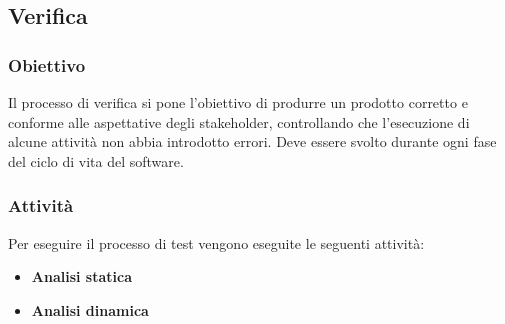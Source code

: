 \subsection{Verifica}
\subsubsection{Obiettivo}
Il processo di verifica si pone l’obiettivo di produrre un prodotto corretto e conforme alle aspettative degli stakeholder, controllando che l'esecuzione di alcune attività non abbia introdotto errori.
Deve essere svolto durante ogni fase del ciclo di vita del software.

\subsubsection{Attività}
Per eseguire il processo di test vengono eseguite le seguenti attività:
\begin{itemize} 
\item \textbf{Analisi statica}
\item \textbf{Analisi dinamica}
\end{itemize}

